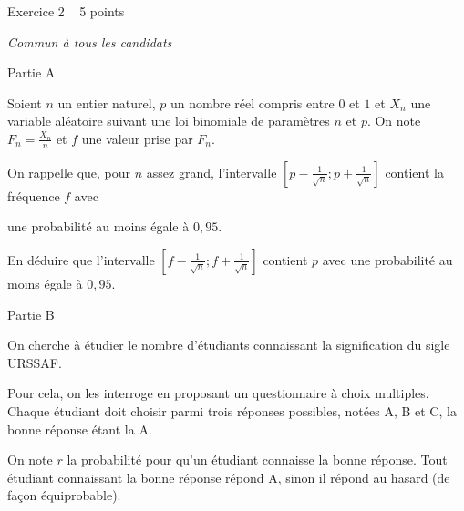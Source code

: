 
%
\begin{h2}Exercice 2   5 points\end{h2}
\textit{Commun à tous les candidats}
\begin{h3}Partie A\end{h3}
Soient $n$ un entier naturel, $p$ un nombre réel compris entre $0$ et $1$ et $X_{n}$ une variable aléatoire suivant une loi binomiale de paramètres $n$ et $p$. On note $F_{n}=\frac{X_{n}}{n}$ et $f$ une valeur prise par $F_{n}$.
\par
On rappelle que, pour $n$ assez grand, l'intervalle $\left[ p-\frac{1}{\sqrt{n}} ; p+\frac{1}{\sqrt{n}} \right]$ contient la fréquence $f$ avec
\par
une probabilité au moins égale à $0,95$.
\par
En déduire que l'intervalle $\left[ f-\frac{1}{\sqrt{n}} ; f+\frac{1}{\sqrt{n}} \right]$ contient $p$ avec une probabilité au moins égale à $0,95$.
\begin{h3}Partie B\end{h3}
On cherche à étudier le nombre d'étudiants connaissant la signification du sigle URSSAF.
\par
Pour cela, on les interroge en proposant un questionnaire à choix multiples. Chaque étudiant doit choisir parmi trois réponses possibles, notées A, B et C, la bonne réponse étant la A.
\par
On note $r$ la probabilité pour qu'un étudiant connaisse la bonne réponse. Tout étudiant connaissant la bonne réponse répond A, sinon il répond au hasard (de façon équiprobable).

